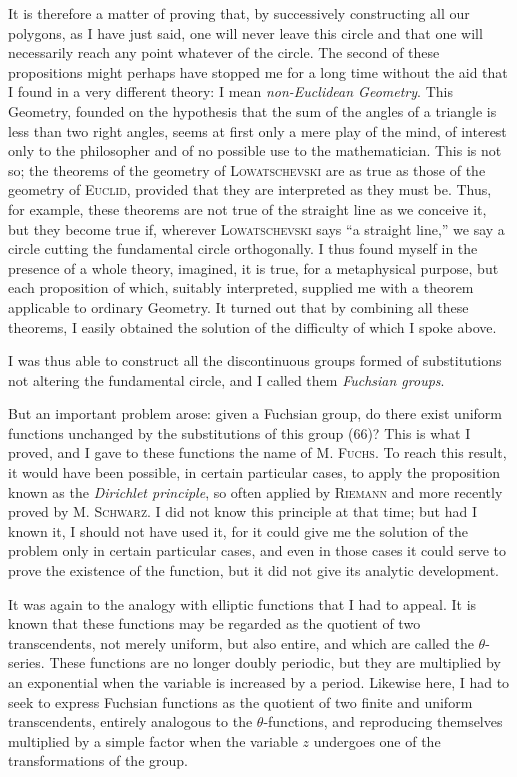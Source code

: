 \documentclass[11pt]{article}
\begin{document}
It is therefore a matter of proving that, by successively constructing all our polygons, as I have just said, one will never leave this circle and that one will necessarily reach any point whatever of the circle. The second of these propositions might perhaps have stopped me for a long time without the aid that I found in a very different theory: I mean \emph{non-Euclidean Geometry}. This Geometry, founded on the hypothesis that the sum of the angles of a triangle is less than two right angles, seems at first only a mere play of the mind, of interest only to the philosopher and of no possible use to the mathematician. This is not so; the theorems of the geometry of \textsc{Lowatschevski} are as true as those of the geometry of \textsc{Euclid}, provided that they are interpreted as they must be. Thus, for example, these theorems are not true of the straight line as we conceive it, but they become true if, wherever \textsc{Lowatschevski} says “a straight line,” we say a circle cutting the fundamental circle orthogonally. I thus found myself in the presence of a whole theory, imagined, it is true, for a metaphysical purpose, but each proposition of which, suitably interpreted, supplied me with a theorem applicable to ordinary Geometry. It turned out that by combining all these theorems, I easily obtained the solution of the difficulty of which I spoke above.

I was thus able to construct all the discontinuous groups formed of substitutions not altering the fundamental circle, and I called them \emph{Fuchsian groups}.

But an important problem arose: given a Fuchsian group, do there exist uniform functions unchanged by the substitutions of this group (66)? This is what I proved, and I gave to these functions the name of M. \textsc{Fuchs}. To reach this result, it would have been possible, in certain particular cases, to apply the proposition known as the \emph{Dirichlet principle}, so often applied by \textsc{Riemann} and more recently proved by M. \textsc{Schwarz}. I did not know this principle at that time; but had I known it, I should not have used it, for it could give me the solution of the problem only in certain particular cases, and even in those cases it could serve to prove the existence of the function, but it did not give its analytic development.

It was again to the analogy with elliptic functions that I had to appeal. It is known that these functions may be regarded as the quotient of two transcendents, not merely uniform, but also entire, and which are called the $\theta$-series. These functions are no longer doubly periodic, but they are multiplied by an exponential when the variable is increased by a period. Likewise here, I had to seek to express Fuchsian functions as the quotient of two finite and uniform transcendents, entirely analogous to the $\theta$-functions, and reproducing themselves multiplied by a simple factor when the variable $z$ undergoes one of the transformations of the group.
\end{document}
